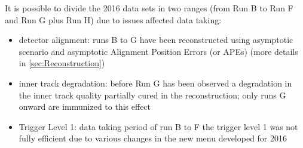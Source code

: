 It is possible to divide the 2016 data sets in two ranges (from Run B to Run F and Run G plus Run H) due to issues affected data taking:
\begin{itemize}
\item detector alignment: runs B to G have been reconstructed using asymptotic scenario and asymptotic Alignment Position Errors (or APEs) (more details in \ref{sec:Reconstruction})
\item inner track degradation: before Run G has been observed a degradation in the inner track quality partially cured in the reconstruction; only runs G onward are immunized to this effect 
\item Trigger Level 1: data taking period of run B to F the trigger level 1 was not fully efficient due to various changes in the new menu developed for 2016
\end{itemize}
